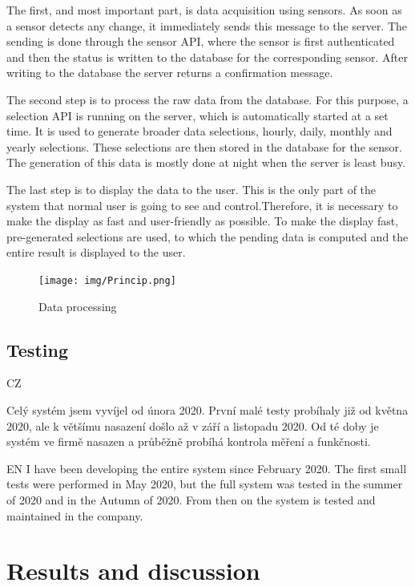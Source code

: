 \documentclass[12pt, a4paper]{article}
\begin{document}
The first, and most important part, is data acquisition using sensors.
As soon as a sensor detects any change, it immediately sends this message to the server.
The sending is done through the sensor API, where the sensor is first authenticated and then the status is written to the database for the corresponding sensor.
After writing to the database the server returns a confirmation message.

The second step is to process the raw data from the database.
For this purpose, a selection API is running on the server, which is automatically started at a set time.
It is used to generate broader data selections, hourly, daily, monthly and yearly selections.
These selections are then stored in the database for the sensor.
The generation of this data is mostly done at night when the server is least busy.

The last step is to display the data to the user.
This is the only part of the system that normal user is going to see and control.Therefore, it is necessary to make the display as fast and user-friendly as possible.
To make the display fast, pre-generated selections are used, to which the pending data is computed and the entire result is displayed to the user.

\begin{figure}[t]
    \centering
    \texttt{[image: img/Princip.png]}
    \caption{Data processing}
    \label{fig:princip}
\end{figure}


\subsection*{Testing}

CZ

Celý systém jsem vyvíjel od února 2020.
První malé testy probíhaly již od května 2020, ale k většímu nasazení došlo až v září a listopadu 2020.
Od té doby je systém ve firmě nasazen a průběžně probíhá kontrola měření a funkčnosti.

EN
I have been developing the entire system since February 2020.
The first small tests were performed in May 2020, but the full system was tested in the summer of 2020 and in the Autumn of 2020.
From then on the system is tested and maintained in the company.


\newpage
\section*{Results and discussion}
\end{document}
